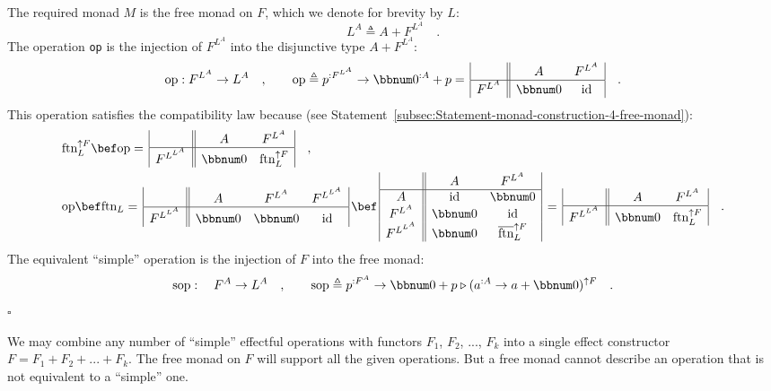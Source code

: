 The required monad $M$ is the free monad on $F$, which we denote
for brevity by $L$:
\[
L^{A}\triangleq A+F^{L^{A}}\quad.
\]
The operation \lstinline!op! is the injection of $F^{L^{A}}$ into
the disjunctive type $A+F^{L^{A}}$:
\[
\text{op}:F^{L^{A}}\rightarrow L^{A}\quad,\quad\quad\text{op}\triangleq p^{:F^{L^{A}}}\rightarrow\bbnum 0^{:A}+p=\,\begin{array}{|c||cc|}
 & A & F^{L^{A}}\\
\hline F^{L^{A}} & \bbnum 0 & \text{id}
\end{array}\quad.
\]
This operation satisfies the compatibility law because (see Statement~\ref{subsec:Statement-monad-construction-4-free-monad}):
\begin{align*}
 & \text{ftn}_{L}^{\uparrow F}\bef\text{op}=\,\begin{array}{|c||cc|}
 & A & F^{L^{A}}\\
\hline F^{L^{L^{A}}} & \bbnum 0 & \text{ftn}_{L}^{\uparrow F}
\end{array}\quad,\\
 & \text{op}\bef\text{ftn}_{L}=\,\begin{array}{|c||ccc|}
 & A & F^{L^{A}} & F^{L^{L^{A}}}\\
\hline F^{L^{L^{A}}} & \bbnum 0 & \bbnum 0 & \text{id}
\end{array}\,\bef\,\begin{array}{|c||cc|}
 & A & F^{L^{A}}\\
\hline A & \text{id} & \bbnum 0\\
F^{L^{A}} & \bbnum 0 & \text{id}\\
F^{L^{L^{A}}} & \bbnum 0 & \overline{\text{ftn}}_{L}^{\uparrow F}
\end{array}\,=\,\begin{array}{|c||cc|}
 & A & F^{L^{A}}\\
\hline F^{L^{L^{A}}} & \bbnum 0 & \text{ftn}_{L}^{\uparrow F}
\end{array}\quad.
\end{align*}
The equivalent \textsf{``}simple\textsf{''} operation is the injection of $F$ into
the free monad:
\[
\text{sop}:\quad F^{A}\rightarrow L^{A}\quad,\quad\quad\text{sop}\triangleq p^{:F^{A}}\rightarrow\bbnum 0+p\triangleright(a^{:A}\rightarrow a+\bbnum 0)^{\uparrow F}\quad.
\]
$\square$

We may combine any number of \textsf{``}simple\textsf{''} effectful operations with
functors $F_{1}$, $F_{2}$, ..., $F_{k}$ into a single effect constructor
$F=F_{1}+F_{2}+...+F_{k}$. The free monad on $F$ will support all
the given operations. But a free monad cannot describe an operation
that is not equivalent to a \textsf{``}simple\textsf{''} one.

